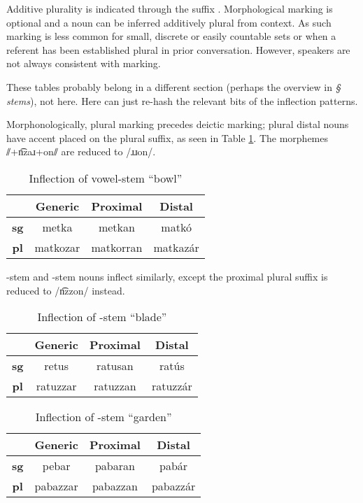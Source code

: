 Additive plurality is indicated through the suffix . Morphological marking is optional and a noun can be inferred additively plural from context.  As such marking is less common for small, discrete or easily countable sets or when a referent has been established plural in prior conversation. However, speakers are not always consistent with marking.

\begin{kaobox}[frametitle=\sc todo:]
    These tables probably belong in a different section (perhaps the overview in \emph{§ stems}), not here. Here can just re-hash the relevant bits of the inflection patterns.
\end{kaobox}

Morphonologically, plural marking precedes deictic marking; plural distal nouns have accent placed on the plural suffix, as seen in Table \ref{tab:metka_inflection}. The morphemes ⫽+n͡zaɹ+on⫽ are reduced to /ɹɹon/.

\begin{table}[h] \centering
\begin{tabular}{c|ccc} \toprule
& \bf Generic & \bf Proximal & \bf Distal \\ \midrule
\bf \sc sg & metka & metkan & matkó \\
\bf \sc pl & matkozar & matkorran & matkazár \\ \bottomrule
\end{tabular}
\caption{Inflection of vowel-stem  “bowl”}
\label{tab:metka_inflection}
\end{table}

-stem and -stem nouns inflect similarly, except the proximal plural suffix is reduced to /n͡zzon/ instead.

\begin{table}[h] \centering
\begin{tabular}{c|ccc} \toprule
& \bf Generic & \bf Proximal & \bf Distal \\ \midrule
\bf \sc sg & retus & ratusan & ratús \\
\bf \sc pl & ratuzzar & ratuzzan & ratuzzár \\ \bottomrule
\end{tabular}
\caption{Inflection of -stem  “blade”}
\end{table}

\begin{table}[h] \centering
\begin{tabular}{c|ccc} \toprule
& \bf Generic & \bf Proximal & \bf Distal \\ \midrule
\bf \sc sg & pebar & pabaran & pabár \\
\bf \sc pl & pabazzar & pabazzan & pabazzár \\ \bottomrule
\end{tabular}
\caption{Inflection of -stem  “garden”}
\end{table}

